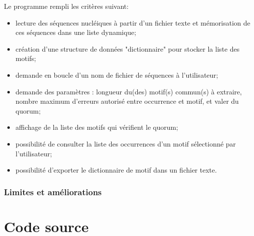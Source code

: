 \documentclass[11pt, oneside]{article}
\begin{document}
Le programme rempli les critères suivant:
\begin{itemize}
\item lecture des séquences nucléiques à partir d'un fichier texte et mémorisation de ces séquences dans une liste dynamique;
\item création d'une structure de données "dictionnaire" pour stocker la liste des motifs;
\item demande en boucle d'un nom de fichier de séquences à l'utilisateur;
\item demande des paramètres : longueur du(des) motif(s) commun(s) à extraire, nombre maximum d'erreurs autorisé entre occurrence et motif, et valer du quorum;
\item affichage de la liste des motifs qui vérifient le quorum;
\item possibilité de consulter la liste des occurrences d'un motif sélectionné par l'utilisateur;
\item possibilité d'exporter le dictionnaire de motif dans un fichier texte.
\end{itemize}

\section{Limites et améliorations}  

\part*{Code source}





\end{document}
